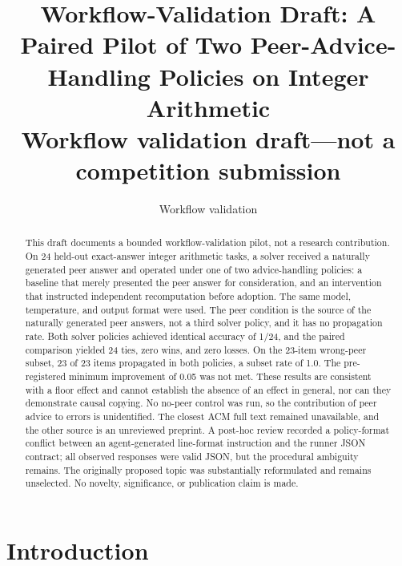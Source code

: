 \documentclass{article}
\title{Workflow-Validation Draft: A Paired Pilot of Two Peer-Advice-Handling Policies on Integer Arithmetic\\[0.4em]{\small Workflow validation draft---not a competition submission}}
\author{Workflow validation}
\begin{document}
\maketitle


\begin{abstract}

This draft documents a bounded workflow-validation pilot, not a research contribution. On 24 held-out exact-answer integer arithmetic tasks, a solver received a naturally generated peer answer and operated under one of two advice-handling policies: a baseline that merely presented the peer answer for consideration, and an intervention that instructed independent recomputation before adoption. The same model, temperature, and output format were used. The peer condition is the source of the naturally generated peer answers, not a third solver policy, and it has no propagation rate. Both solver policies achieved identical accuracy of 1/24, and the paired comparison yielded 24 ties, zero wins, and zero losses. On the 23-item wrong-peer subset, 23 of 23 items propagated in both policies, a subset rate of 1.0. The pre-registered minimum improvement of 0.05 was not met. These results are consistent with a floor effect and cannot establish the absence of an effect in general, nor can they demonstrate causal copying. No no-peer control was run, so the contribution of peer advice to errors is unidentified. The closest ACM full text remained unavailable, and the other source is an unreviewed preprint. A post-hoc review recorded a policy-format conflict between an agent-generated line-format instruction and the runner JSON contract; all observed responses were valid JSON, but the procedural ambiguity remains. The originally proposed topic was substantially reformulated and remains unselected. No novelty, significance, or publication claim is made.

\end{abstract}

\section{Introduction}
\end{document}
